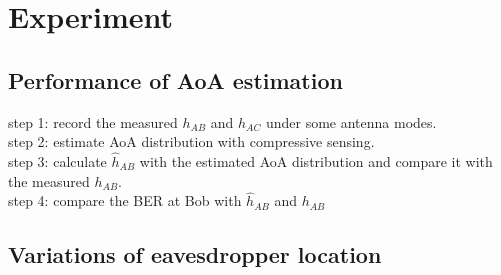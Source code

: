 \section{Experiment}
\subsection{Performance of AoA estimation}
step 1: record the measured $h_{AB}$ and $h_{AC}$ under some antenna modes.\\
step 2: estimate AoA distribution with compressive sensing.\\
step 3: calculate $\hat{h}_{AB}$ with the estimated AoA distribution and compare it with the measured $h_{AB}$.\\
step 4: compare the BER at Bob with $\hat{h}_{AB}$ and $h_{AB}$
\subsection{Variations of eavesdropper location}
